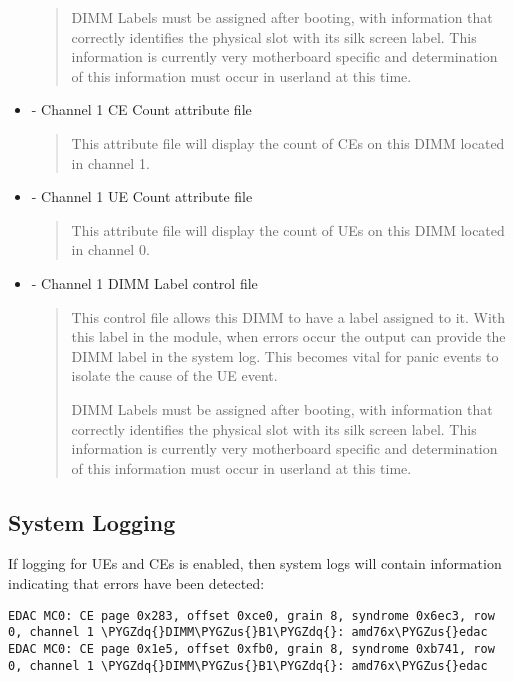 \documentclass[a4paper,8pt,english]{sphinxmanual}
\def\PYGZus{\char`\_}
\def\PYGZdq{\char`\"}
\begin{document}
\begin{itemize}
\begin{quote}
DIMM Labels must be assigned after booting, with information
that correctly identifies the physical slot with its
silk screen label. This information is currently very
motherboard specific and determination of this information
must occur in userland at this time.
\end{quote}

\item {} 
 - Channel 1 CE Count attribute file
\begin{quote}

This attribute file will display the count of CEs on this
DIMM located in channel 1.
\end{quote}

\item {} 
 - Channel 1 UE Count attribute file
\begin{quote}

This attribute file will display the count of UEs on this
DIMM located in channel 0.
\end{quote}

\item {} 
 - Channel 1 DIMM Label control file
\begin{quote}

This control file allows this DIMM to have a label assigned
to it. With this label in the module, when errors occur
the output can provide the DIMM label in the system log.
This becomes vital for panic events to isolate the
cause of the UE event.

DIMM Labels must be assigned after booting, with information
that correctly identifies the physical slot with its
silk screen label. This information is currently very
motherboard specific and determination of this information
must occur in userland at this time.
\end{quote}

\end{itemize}


\subsection{System Logging}
\label{admin-guide/ras:system-logging}
If logging for UEs and CEs is enabled, then system logs will contain
information indicating that errors have been detected:

\begin{Verbatim}[commandchars=\\\{\}]
EDAC MC0: CE page 0x283, offset 0xce0, grain 8, syndrome 0x6ec3, row 0, channel 1 \PYGZdq{}DIMM\PYGZus{}B1\PYGZdq{}: amd76x\PYGZus{}edac
EDAC MC0: CE page 0x1e5, offset 0xfb0, grain 8, syndrome 0xb741, row 0, channel 1 \PYGZdq{}DIMM\PYGZus{}B1\PYGZdq{}: amd76x\PYGZus{}edac
\end{Verbatim}
\end{document}
